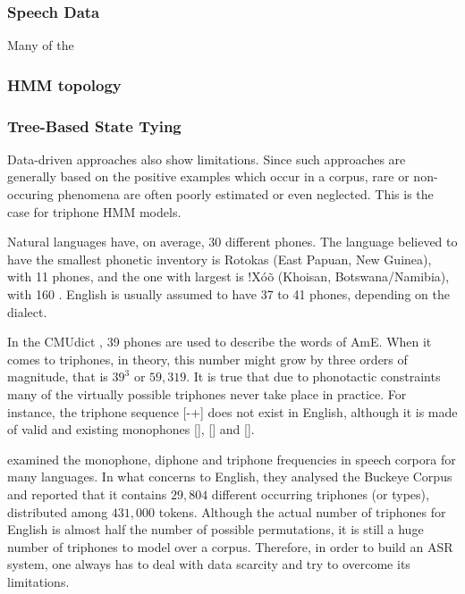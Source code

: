 \clearpage
\subsubsection{Speech Data}

Many of the 



\subsubsection{HMM topology}

\subsubsection{Tree-Based State Tying}

Data-driven approaches also show limitations. Since such approaches are generally based on 
the positive examples which occur in a corpus, rare or non-occuring phenomena are often poorly estimated or even neglected.
This is the case for triphone \ac{HMM} models. 

Natural languages have, on average, $30$ different phones. The language believed to have the smallest phonetic inventory is 
Rotokas (East Papuan, New Guinea), with 11 phones, and the one with largest is !X\'o\~o  (Khoisan, Botswana/Namibia), 
with 160 \citep{Hayes2011}. English is usually assumed to have 37 to 41 phones, depending on the dialect. 

In the \ac{CMUdict} \citep{CMU2008}, 39 phones are used to describe the words of \ac{AmE}. When it comes to triphones, in theory, 
this number might grow by three orders of magnitude, that is $39^3$ or $59,319$. It is true that due to phonotactic constraints
many of the virtually possible triphones never take place in practice. 
For instance, the triphone sequence [-+] does not exist in English, although it 
is made of valid and existing monophones [], [] and []. 

\citeauthor{Kuperman2008} \citep{Kuperman2008} examined the monophone, diphone and triphone frequencies in speech corpora
for many languages. In what concerns to English, they analysed the Buckeye Corpus and reported that it contains $29,804$ different 
occurring triphones (or types), distributed among $431,000$ tokens. Although the actual number of triphones for English is
almost half the number of possible permutations, it is still a huge number of triphones to model over a corpus. 
Therefore, in order to build an \ac{ASR} system, one always has to deal with data scarcity and try to overcome its limitations.

